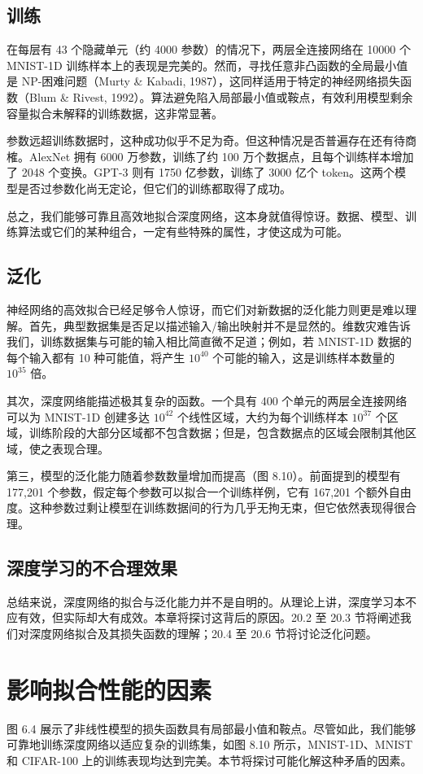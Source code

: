 \documentclass[lang=cn,newtx,10pt,scheme=chinese]{elegantbook}
\begin{document}
\subsection{训练}
在每层有 43 个隐藏单元（约 4000 参数）的情况下，两层全连接网络在 10000 个 MNIST-1D 训练样本上的表现是完美的。然而，寻找任意非凸函数的全局最小值是 NP-困难问题（Murty \& Kabadi, 1987），这同样适用于特定的神经网络损失函数（Blum \& Rivest, 1992）。算法避免陷入局部最小值或鞍点，有效利用模型剩余容量拟合未解释的训练数据，这非常显著。

参数远超训练数据时，这种成功似乎不足为奇。但这种情况是否普遍存在还有待商榷。AlexNet 拥有 6000 万参数，训练了约 100 万个数据点，且每个训练样本增加了 2048 个变换。GPT-3 则有 1750 亿参数，训练了 3000 亿个 token。这两个模型是否过参数化尚无定论，但它们的训练都取得了成功。

总之，我们能够可靠且高效地拟合深度网络，这本身就值得惊讶。数据、模型、训练算法或它们的某种组合，一定有些特殊的属性，才使这成为可能。

\subsection{泛化}
神经网络的高效拟合已经足够令人惊讶，而它们对新数据的泛化能力则更是难以理解。首先，典型数据集是否足以描述输入/输出映射并不是显然的。维数灾难告诉我们，训练数据集与可能的输入相比简直微不足道；例如，若 MNIST-1D 数据的每个输入都有 10 种可能值，将产生 \(10^{40}\) 个可能的输入，这是训练样本数量的 \(10^{35}\) 倍。

其次，深度网络能描述极其复杂的函数。一个具有 400 个单元的两层全连接网络可以为 MNIST-1D 创建多达 \(10^{42}\) 个线性区域，大约为每个训练样本 \(10^{37}\) 个区域，训练阶段的大部分区域都不包含数据；但是，包含数据点的区域会限制其他区域，使之表现合理。

第三，模型的泛化能力随着参数数量增加而提高（图 8.10）。前面提到的模型有 177,201 个参数，假定每个参数可以拟合一个训练样例，它有 167,201 个额外自由度。这种参数过剩让模型在训练数据间的行为几乎无拘无束，但它依然表现得很合理。

\subsection{深度学习的不合理效果}
总结来说，深度网络的拟合与泛化能力并不是自明的。从理论上讲，深度学习本不应有效，但实际却大有成效。本章将探讨这背后的原因。20.2 至 20.3 节将阐述我们对深度网络拟合及其损失函数的理解；20.4 至 20.6 节将讨论泛化问题。

\section{影响拟合性能的因素}
图 6.4 展示了非线性模型的损失函数具有局部最小值和鞍点。尽管如此，我们能够可靠地训练深度网络以适应复杂的训练集，如图 8.10 所示，MNIST-1D、MNIST 和 CIFAR-100 上的训练表现均达到完美。本节将探讨可能化解这种矛盾的因素。
\end{document}
